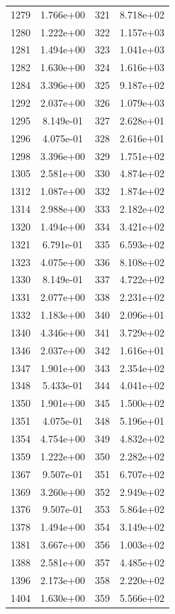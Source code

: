 \documentclass[12pt]{article}
\begin{document}
\begin{longtable}{@{}cccc@{}}
1279 & 1.766e+00 & 321 & 8.718e+02 \\
1280 & 1.222e+00 & 322 & 1.157e+03 \\
1281 & 1.494e+00 & 323 & 1.041e+03 \\
1282 & 1.630e+00 & 324 & 1.616e+03 \\
1284 & 3.396e+00 & 325 & 9.187e+02 \\
1292 & 2.037e+00 & 326 & 1.079e+03 \\
1295 & 8.149e-01 & 327 & 2.628e+01 \\
1296 & 4.075e-01 & 328 & 2.616e+01 \\
1298 & 3.396e+00 & 329 & 1.751e+02 \\
1305 & 2.581e+00 & 330 & 4.874e+02 \\
1312 & 1.087e+00 & 332 & 1.874e+02 \\
1314 & 2.988e+00 & 333 & 2.182e+02 \\
1320 & 1.494e+00 & 334 & 3.421e+02 \\
1321 & 6.791e-01 & 335 & 6.593e+02 \\
1323 & 4.075e+00 & 336 & 8.108e+02 \\
1330 & 8.149e-01 & 337 & 4.722e+02 \\
1331 & 2.077e+00 & 338 & 2.231e+02 \\
1332 & 1.183e+00 & 340 & 2.096e+01 \\
1340 & 4.346e+00 & 341 & 3.729e+02 \\
1346 & 2.037e+00 & 342 & 1.616e+01 \\
1347 & 1.901e+00 & 343 & 2.354e+02 \\
1348 & 5.433e-01 & 344 & 4.041e+02 \\
1350 & 1.901e+00 & 345 & 1.500e+02 \\
1351 & 4.075e-01 & 348 & 5.196e+01 \\
1354 & 4.754e+00 & 349 & 4.832e+02 \\
1359 & 1.222e+00 & 350 & 2.282e+02 \\
1367 & 9.507e-01 & 351 & 6.707e+02 \\
1369 & 3.260e+00 & 352 & 2.949e+02 \\
1376 & 9.507e-01 & 353 & 5.864e+02 \\
1378 & 1.494e+00 & 354 & 3.149e+02 \\
1381 & 3.667e+00 & 356 & 1.003e+02 \\
1388 & 2.581e+00 & 357 & 4.485e+02 \\
1396 & 2.173e+00 & 358 & 2.220e+02 \\
1404 & 1.630e+00 & 359 & 5.566e+02 \\

\end{longtable}
\end{document}
